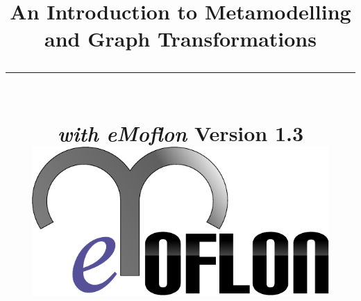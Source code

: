 \title{
\flushright
{\LARGE\bfseries An Introduction to Metamodelling\\
and Graph Transformations}
\noindent\rule[-1ex]{\textwidth}{5pt}\\[2.5ex]
\hfill\emph{\LARGE\bfseries with eMoflon}
\flushleft
{\small Version 1.3}
\flushright
\includegraphics[width=0.85\textwidth]{pics/eMoflon3} 
}

\date{}  
\author{} 